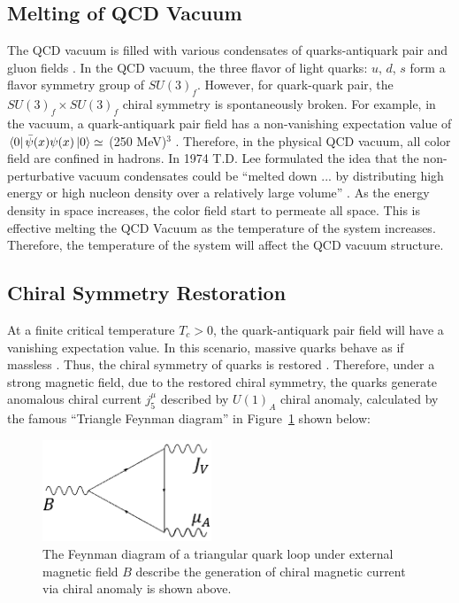 
\subsection{Melting of QCD Vacuum}

The QCD vacuum is filled with various condensates of quarks-antiquark pair and gluon fields \cite{QCDVacuum}. In the QCD vacuum, the three flavor of light quarks: $u$, $d$, $s$ form a flavor symmetry group of $SU(3)_f$. However, for quark-quark pair, the $SU(3)_f \times SU(3)_f$ chiral symmetry is spontaneously broken. For example, in the vacuum, a quark-antiquark pair field has a non-vanishing expectation value of $\bra{0} \bar \psi (x)  \psi(x) \ket{0} \simeq$ (250 MeV)$^3$ \cite{}. Therefore, in the physical QCD vacuum, all color field are confined in hadrons. In 1974 T.D. Lee formulated the idea that the non-perturbative vacuum condensates could be ``melted down ... by distributing high energy or high nucleon density over a relatively large volume'' \cite{StockR,QCDVacMelt}. As the energy density in space increases, the color field start to permeate all space. This is effective melting the QCD Vacuum as the temperature of the system increases. Therefore, the temperature of the system will affect the QCD vacuum structure. 


\subsection{Chiral Symmetry Restoration}

At a finite critical temperature $T_c > 0$, the quark-antiquark pair field will have a vanishing expectation value. In this scenario, massive quarks behave as if massless \cite{ChiralTemperature}. Thus, the chiral symmetry of quarks is restored \cite{ChiralRestore}. Therefore, under a strong magnetic field, due to the restored chiral symmetry, the quarks generate anomalous chiral current $j^{\mu}_{5}$ described by $U(1)_A$ chiral anomaly, calculated by the famous ``Triangle Feynman diagram'' in Figure~\ref{ChiralFeynman} shown below:



\begin{figure}[hbtp]
\begin{center}
\includegraphics[width=0.45\textwidth]{Figures/Chapter1/ChiralTriangle.png}
\caption{The Feynman diagram of a triangular quark loop under external magnetic field $B$ describe the generation of chiral magnetic current via chiral anomaly is shown above.}
\label{ChiralFeynman}
\end{center}
\end{figure} 


